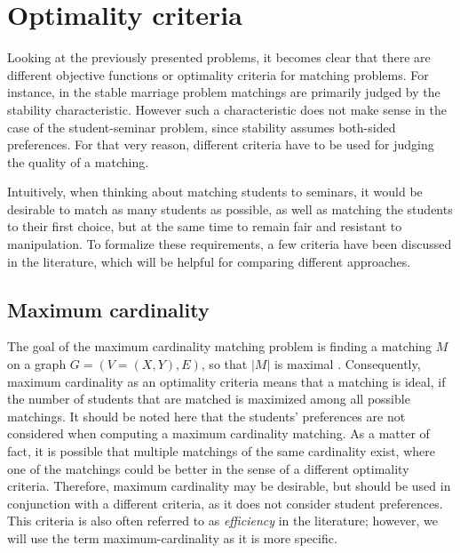\section{Optimality criteria}\label{sec:optimality}
Looking at the previously presented problems, it becomes clear that there are different objective functions or optimality criteria for matching problems. For instance, in the stable marriage problem matchings are primarily judged by the stability characteristic. However such a characteristic does not make sense in the case of the student-seminar problem, since stability assumes both-sided preferences. For that very reason, different criteria have to be used for judging the quality of a matching.

Intuitively, when thinking about matching students to seminars, it would be desirable to match as many students as possible, as well as matching the students to their first choice, but at the same time to remain fair and resistant to manipulation. To formalize these requirements, a few criteria have been discussed in the literature, which will be helpful for comparing different approaches. 

\subsection{Maximum cardinality}
The goal of the maximum cardinality matching problem is finding a matching $M$ on a graph $G=(V=(X, Y), E)$, so that $|M|$ is maximal \cite{GraphTheoryIntro}. Consequently, maximum cardinality as an optimality criteria means that a matching is ideal, if the number of students that are matched is maximized among all possible matchings. It should be noted here that the students' preferences are not considered when computing a maximum cardinality matching. As a matter of fact, it is possible that multiple matchings of the same cardinality exist, where one of the matchings could be better in the sense of a different optimality criteria. Therefore, maximum cardinality may be desirable, but should be used in conjunction with a different criteria, as it does not consider student preferences. This criteria is also often referred to as \emph{efficiency} in the literature; however, we will use the term maximum-cardinality as it is more specific.

